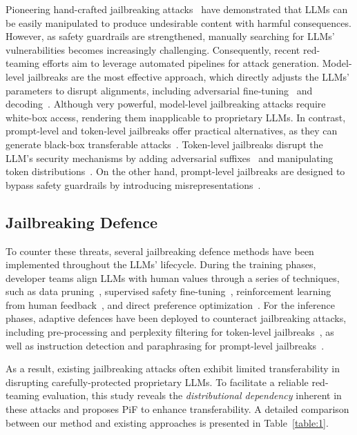 Pioneering hand-crafted jailbreaking attacks~\citep{shen2023anything, liu2023jailbreaking} have demonstrated that LLMs can be easily manipulated to produce undesirable content with harmful consequences. 
However, as safety guardrails are strengthened, manually searching for LLMs' vulnerabilities becomes increasingly challenging.
Consequently, recent red-teaming efforts aim to leverage automated pipelines for attack generation.
Model-level jailbreaks are the most effective approach, which directly adjusts the LLMs' parameters to disrupt alignments, including adversarial fine-tuning~\citep{yang2023shadow, qi2024fine} and decoding~\citep{huang2023catastrophic, zhang2023safety}.
Although very powerful, model-level jailbreaking attacks require white-box access, rendering them inapplicable to proprietary LLMs.
In contrast, prompt-level and token-level jailbreaks offer practical alternatives, as they can generate black-box transferable attacks~\citep{zou2023universal, chao2023jailbreaking}.
Token-level jailbreaks disrupt the LLM's security mechanisms by adding adversarial suffixes~\citep{lapid2023open, liuautodan, sitawarin2024pal} and manipulating token distributions~\citep{yong2023low, deng2024multilingual,zhao2024weak}.
On the other hand, prompt-level jailbreaks are designed to bypass safety guardrails by introducing misrepresentations~\citep{mehrotra2023tree, li2023deepinception}.

\subsection{Jailbreaking Defence}
\label{section:2_3}

To counter these threats, several jailbreaking defence methods have been implemented throughout the LLMs' lifecycle.
During the training phases, developer teams align LLMs with human values through a series of techniques, such as data pruning~\citep{lukas2023analyzing, openAI2023our, llama3modelcard}, supervised safety fine-tuning~\citep{touvron2023llama, chung2024scaling}, reinforcement learning from human feedback~\citep{schulman2017proximal, christiano2017deep, bai2022training}, and direct preference optimization~\citep{rafailov2024direct, zengtoken}.
For the inference phases, adaptive defences have been deployed to counteract jailbreaking attacks, including pre-processing and perplexity filtering for token-level jailbreaks~\citep{kumar2023certifying, robey2023smoothllm,alon2023detecting, jain2023baseline}, as well as instruction detection and paraphrasing for prompt-level jailbreaks~\citep{inan2023llama, markov2023holistic,zhang2023defending, zheng2024prompt, xie2023defending}.

As a result, existing jailbreaking attacks often exhibit limited transferability in disrupting carefully-protected proprietary LLMs.
To facilitate a reliable red-teaming evaluation, this study reveals the \emph{distributional dependency} inherent in these attacks and proposes PiF to enhance transferability.
A detailed comparison between our method and existing approaches is presented in Table~\ref{table:1}.
